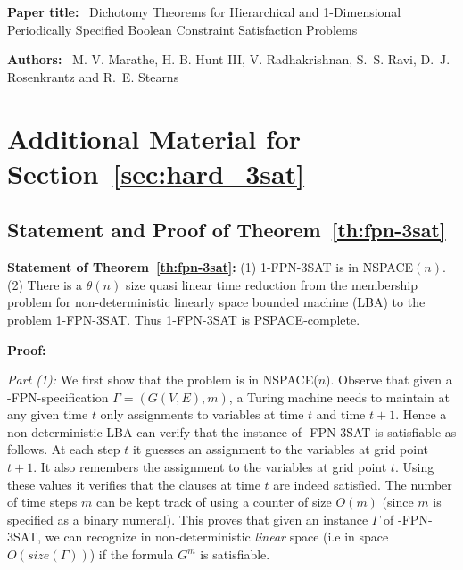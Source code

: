 
\appendix

\vspace*{3in}

\begin{center}
\end{center}

\bigskip\bigskip


\noindent
\textbf{Paper title:}~ Dichotomy Theorems for Hierarchical and 1-Dimensional
Periodically Specified Boolean Constraint Satisfaction Problems

\bigskip

\noindent
\textbf{Authors:}~ M. V. Marathe, H. B. Hunt III, V. Radhakrishnan, S.~S. Ravi,
D.~J. Rosenkrantz and R.~E. Stearns

\clearpage

\section{Additional Material for Section~\ref{sec:hard_3sat}}

\subsection{Statement and Proof of Theorem~\ref{th:fpn-3sat}}

\noindent
\textbf{Statement of Theorem~\ref{th:fpn-3sat}:}
(1) 1-FPN-3SAT is in NSPACE$(n)$.~
(2) There is a $\theta(n)$ size 
quasi linear time reduction from the membership problem
for  non-deterministic linearly space bounded machine (LBA) 
to the problem 1-FPN-3SAT. 
Thus 1-FPN-3SAT is {\sf PSPACE}-complete. 

\medskip

\noindent
{\bf Proof:}  

\noindent
{\em Part (1):}
We first show that the problem is in {\sf NSPACE($n$)}.
Observe that given a {-FPN}-specification 
$\Gamma = (G(V,E), m)$, a Turing machine 
needs to maintain at any given time $t$ 
only assignments to variables at time $t$ and time $t+1$. 
Hence a non deterministic {\sf LBA}
can verify that the instance of {-FPN-3SAT} is satisfiable as follows. At 
each step $t$ it guesses an assignment to the variables at grid point $t+1$.
It also remembers the assignment to the variables at grid point $t$. Using
these values it verifies that the clauses at time $t$ are indeed satisfied.
The number of time steps  $m$ can be kept track of using a counter of size
$O(m)$ (since $m$ is specified as a binary numeral). 
This proves that given an instance $\Gamma$ 
of {-FPN-3SAT}, we can recognize in 
non-deterministic {\em linear } space (i.e in space $O(size(\Gamma))$) 
if the formula $G^m$ is satisfiable.

